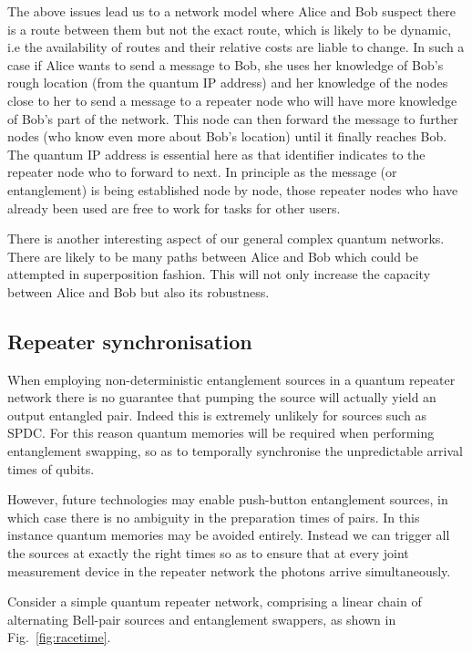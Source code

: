 The above issues lead us to a network model where Alice and Bob suspect there is a route between them but not the exact route, which is likely to be dynamic, i.e the availability of routes and their relative costs are liable to change. In such a case if Alice wants to send a message to Bob, she uses her knowledge of Bob's rough location (from the quantum IP address) and her knowledge of the nodes close to her to send a message to a repeater node who will have more knowledge of Bob's part of the network. This node can then forward the message to further nodes (who know even more about Bob's location) until it finally reaches Bob. The quantum IP address is essential here as that identifier indicates to the repeater node who to forward to next. In principle as the message (or entanglement) is being established node by node, those repeater nodes who have already been used are free to work for tasks for other users. 

There is another interesting aspect of our general complex quantum networks. There are likely to be many paths between Alice and Bob which could be attempted in superposition fashion. This will not only increase the capacity between Alice and Bob but also its robustness.

%
%

\subsection{Repeater synchronisation}

When employing non-deterministic entanglement sources in a quantum repeater network there is no guarantee that pumping the source will actually yield an output entangled pair. Indeed this is extremely unlikely for sources such as SPDC. For this reason quantum memories will be required when performing entanglement swapping, so as to temporally synchronise the unpredictable arrival times of qubits.

However, future technologies may enable push-button entanglement sources, in which case there is no ambiguity in the preparation times of pairs. In this instance quantum memories may be avoided entirely. Instead we can trigger all the sources at exactly the right times so as to ensure that at every joint measurement device in the repeater network the photons arrive simultaneously.

Consider a simple quantum repeater network, comprising a linear chain of alternating Bell-pair sources and entanglement swappers, as shown in Fig.~\ref{fig:racetime}.

